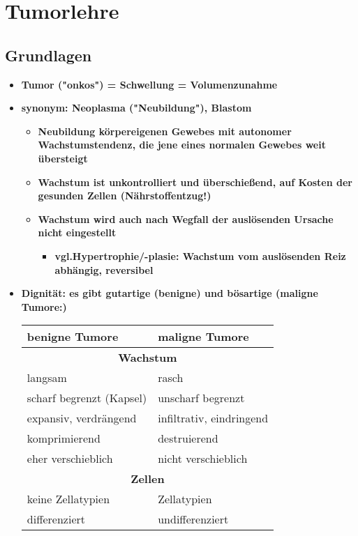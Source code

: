 \section{Tumorlehre}
	\subsection{Grundlagen}
		\begin{itemize}
			\item \textbf{Tumor ("onkos") = Schwellung = Volumenzunahme}
			\item \textbf{synonym: Neoplasma ("Neubildung"), Blastom}
				\begin{itemize}
					\item \textbf{Neubildung körpereigenen Gewebes mit autonomer Wachstumstendenz, die jene eines normalen Gewebes weit übersteigt}
					\item \textbf{Wachstum ist unkontrolliert und überschießend, auf Kosten der gesunden Zellen (Nährstoffentzug!)}
					\item \textbf{Wachstum wird auch nach Wegfall der auslösenden Ursache nicht eingestellt}
						\begin{itemize}
							\item \textbf{vgl.Hypertrophie/-plasie: Wachstum vom auslösenden Reiz abhängig, reversibel}
						\end{itemize}
				\end{itemize}
			\item \textbf{Dignität: es gibt gutartige (benigne) und bösartige (maligne Tumore:)}
				\begin{center}
					\begin{tabular}{|ll|}
						\hline
						\textbf{benigne Tumore} & \textbf{maligne Tumore} \\
						\hline
						\multicolumn{2}{|c|}{\textbf{Wachstum}} \\ 
						langsam & rasch \\ 
						scharf begrenzt (Kapsel) & unscharf begrenzt \\ 
						expansiv, verdrängend & infiltrativ, eindringend \\
						komprimierend & destruierend \\
						eher verschieblich & nicht verschieblich \\
						\multicolumn{2}{|c|}{\textbf{Zellen}} \\
						keine Zellatypien & Zellatypien \\
						differenziert & undifferenziert \\

\end{tabular}
\end{center}
\end{itemize}

